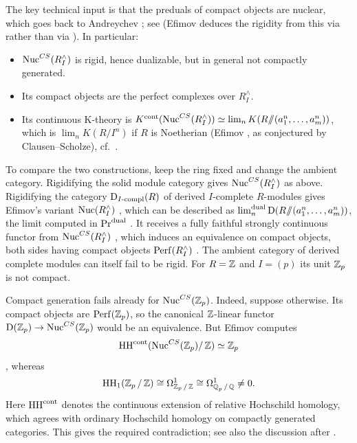 \begin{example}
		The key technical input is that the preduals of compact objects are nuclear, which goes back to Andreychev \cite[Lemma~3.8 and Korollar~3.14]{Andreychev_Thesis}; see \cite[Propositions~7.4 and~7.5]{Efimov_Inverse_Limits} (Efimov deduces the rigidity from this via \cite[Propositions~1.33 and~1.34]{Efimov_Inverse_Limits} rather than via ). In particular:
		\begin{itemize}
			\item $\operatorname{Nuc}^{CS}(R^{\wedge}_I)$ is rigid, hence dualizable, but in general not compactly generated.
			\item Its compact objects are the perfect complexes over $R^{\wedge}_I$.
			\item Its continuous K-theory is $K^{\operatorname{cont}}(\operatorname{Nuc}^{CS}(R^{\wedge}_I)) \simeq \operatorname{lim}_n K(R /\!\!/ (a_1^n,\dots,a_m^n))$, which is $\lim_n K(R/I^n)$ if $R$ is Noetherian (Efimov \cite[Corollary~7.10]{Efimov_Inverse_Limits}, as conjectured by Clausen--Scholze), cf.\ .
		\end{itemize}

		To compare the two constructions, keep the ring fixed and change the ambient category. Rigidifying the solid module category gives $\operatorname{Nuc}^{CS}(R^{\wedge}_I)$ as above. Rigidifying the category $\operatorname{\mathrm{D}}_{I\text{-}\mathrm{compl}}(R)$ of derived $I$-complete $R$-modules gives Efimov’s variant $\operatorname{Nuc}(R^{\wedge}_I)$ \cite[Definition~3.28 and Proposition~4.3]{Efimov_Inverse_Limits}, which can be described as $\operatorname{lim}^{\operatorname{dual}}_n \operatorname{\mathrm{D}}(R /\!\!/ (a_1^n,\dots,a_m^n))$, the limit computed in $\textup{Pr}^{\operatorname{dual}}$ \cite[Proposition~5.23]{Efimov_Inverse_Limits}. It receives a fully faithful strongly continuous functor from $\operatorname{Nuc}^{CS}(R^{\wedge}_I)$ \cite[Corollary~7.6]{Efimov_Inverse_Limits}, which induces an equivalence on compact objects, both sides having compact objects $\operatorname{Perf}(R^{\wedge}_I)$ \cite[Proposition~3.29]{Efimov_Inverse_Limits}. The ambient category of derived complete modules can itself fail to be rigid. For $R=\operatorname{\mathbb Z}$ and $I=(p)$ its unit $\operatorname{\mathbb Z}_p$ is not compact.

		Compact generation fails already for $\operatorname{Nuc}^{CS}(\operatorname{\mathbb Z}_p)$. Indeed, suppose otherwise. Its compact objects are $\operatorname{Perf}(\operatorname{\mathbb Z}_p)$, so the canonical $\operatorname{\mathbb Z}$-linear functor $\operatorname{\mathrm{D}}(\operatorname{\mathbb Z}_p) \to \operatorname{Nuc}^{CS}(\operatorname{\mathbb Z}_p)$ would be an equivalence. But Efimov computes
		\[
			\mathrm{HH}^{\operatorname{cont}}(\operatorname{Nuc}^{CS}(\operatorname{\mathbb Z}_p)/\operatorname{\mathbb Z}) \simeq \operatorname{\mathbb Z}_p
		\]
		\cite[Corollary~7.20(i)]{Efimov_Inverse_Limits}, whereas
		\[
			\mathrm{HH}_1(\operatorname{\mathbb Z}_p/\operatorname{\mathbb Z}) \cong \Omega^1_{\operatorname{\mathbb Z}_p/\operatorname{\mathbb Z}} \cong \Omega^1_{\operatorname{\mathbb Q}_p/\operatorname{\mathbb Q}} \neq 0.
		\]
		Here $\mathrm{HH}^{\operatorname{cont}}$ denotes the continuous extension of relative Hochschild homology, which agrees with ordinary Hochschild homology on compactly generated categories. This gives the required contradiction; see also the discussion after \cite[Remark~7.21]{Efimov_Inverse_Limits}.


\end{example}
